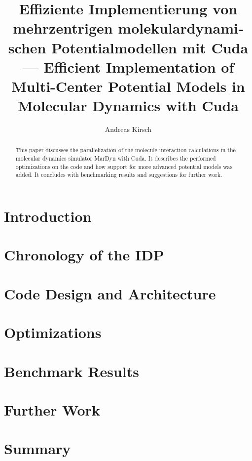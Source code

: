 \documentclass[11pt,a4paper,onecolumn,notitlepage]{scrartcl}
\author{Andreas Kirsch}
\title{\foreignlanguage{ngerman}{Effiziente Implementierung von mehrzentrigen molekulardynamischen Potentialmodellen mit Cuda} \linebreak --- \linebreak Efficient Implementation of Multi-Center Potential Models in Molecular Dynamics with Cuda}
\newcommand{\cuda}{Cuda}
\begin{document}
\maketitle

\begin{abstract}
This paper discusses the parallelization of the molecule interaction calculations in the molecular dynamics simulator MarDyn with \cuda. It describes the performed optimizations on the code and how support for more advanced potential models was added. It concludes with benchmarking results and suggestions for further work.
\end{abstract}

\section{Introduction}



\section{Chronology of the IDP}



\section{Code Design and Architecture}



\section{Optimizations}



\section{Benchmark Results}



\section{Further Work}



\section{Summary}




\end{document}
